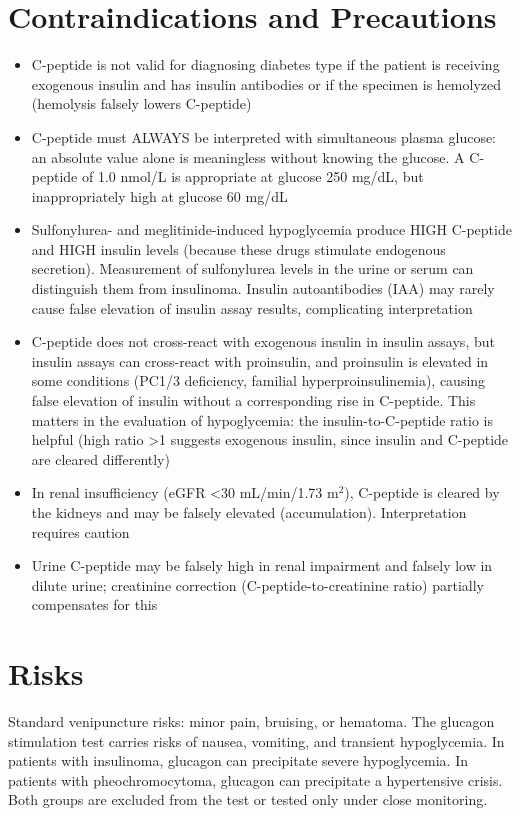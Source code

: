 \section*{Contraindications and Precautions}
\begin{itemize}
  \item C-peptide is not valid for diagnosing diabetes type if the patient is receiving exogenous insulin and has insulin antibodies or if the specimen is hemolyzed (hemolysis falsely lowers C-peptide)
  \item C-peptide must ALWAYS be interpreted with simultaneous plasma glucose: an absolute value alone is meaningless without knowing the glucose. A C-peptide of 1.0 nmol/L is appropriate at glucose 250 mg/dL, but inappropriately high at glucose 60 mg/dL
  \item Sulfonylurea- and meglitinide-induced hypoglycemia produce HIGH C-peptide and HIGH insulin levels (because these drugs stimulate endogenous secretion). Measurement of sulfonylurea levels in the urine or serum can distinguish them from insulinoma. Insulin autoantibodies (IAA) may rarely cause false elevation of insulin assay results, complicating interpretation
  \item C-peptide does not cross-react with exogenous insulin in insulin assays, but insulin assays can cross-react with proinsulin, and proinsulin is elevated in some conditions (PC1/3 deficiency, familial hyperproinsulinemia), causing false elevation of insulin without a corresponding rise in C-peptide. This matters in the evaluation of hypoglycemia: the insulin-to-C-peptide ratio is helpful (high ratio >1 suggests exogenous insulin, since insulin and C-peptide are cleared differently)
  \item In renal insufficiency (eGFR <30 mL/min/1.73 m$^2$), C-peptide is cleared by the kidneys and may be falsely elevated (accumulation). Interpretation requires caution
  \item Urine C-peptide may be falsely high in renal impairment and falsely low in dilute urine; creatinine correction (C-peptide-to-creatinine ratio) partially compensates for this
\end{itemize}
\section*{Risks}
Standard venipuncture risks: minor pain, bruising, or hematoma. The glucagon stimulation test carries risks of nausea, vomiting, and transient hypoglycemia. In patients with insulinoma, glucagon can precipitate severe hypoglycemia. In patients with pheochromocytoma, glucagon can precipitate a hypertensive crisis. Both groups are excluded from the test or tested only under close monitoring.

